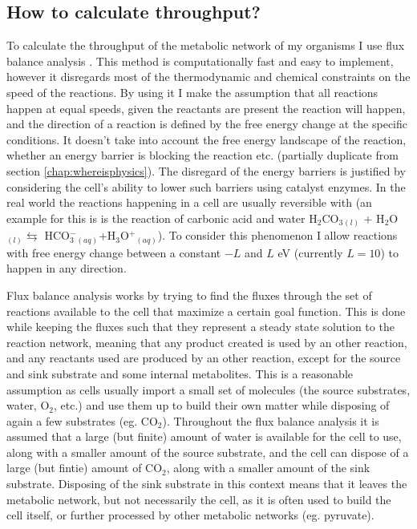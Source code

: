\documentclass[10pt,a4paper]{article}
\begin{document}
	
	\subsection{How to calculate throughput?}\label{chap:throughput}
	
	To calculate the throughput of the metabolic network of my organisms I use flux balance analysis \cite{whatisfluxbalance}. This method is computationally fast and easy to implement, however it disregards most of the thermodynamic and chemical constraints on the speed of the reactions. By using it I make the assumption that all reactions happen at equal speeds, given the reactants are present the reaction will happen, and the direction of a reaction is defined by the free energy change at the specific conditions. It doesn't take into account the free energy landscape of the reaction, whether an energy barrier is blocking the reaction etc. (partially duplicate from section \ref{chap:whereisphysics}). The disregard of the energy barriers is justified by considering the cell's ability to lower such barriers using catalyst enzymes. In the real world the reactions happening in a cell are usually reversible with (an example for this is is the reaction of carbonic acid and water H$_2$CO$_3$$_{(l)}$ + H$_2$O$_{(l)} \leftrightarrows$ HCO$^-_3$$_{(aq)}$+H$_3$O$^+$$_{(aq)}$). To consider this phenomenon I allow reactions with free energy change between a constant $-L$ and $L$ eV (currently $L=10$) to happen in any direction. 
	
	Flux balance analysis works by trying to find the fluxes through the set of reactions available to the cell that maximize a certain goal function. This is done while keeping the fluxes such that they represent a steady state solution to the reaction network, meaning that any product created is used by an other reaction, and any reactants used are produced by an other reaction, except for the source and sink substrate and some internal metabolites. This is a reasonable assumption as cells usually import a small set of molecules (the source substrates, water, O$_2$, etc.) and use them up to build their own matter while disposing of again a few substrates (eg. CO$_2$). Throughout the flux balance analysis it is assumed that a large (but finite) amount of water is available for the cell to use, along with a smaller amount of the source substrate, and the cell can dispose of a large (but fintie) amount of CO$_2$, along with a smaller amount of the sink substrate. Disposing of the sink substrate in this context means that it leaves the metabolic network, but not necessarily the cell, as it is often used to build the cell itself, or further processed by other metabolic networks (eg. pyruvate).
	
\end{document}
